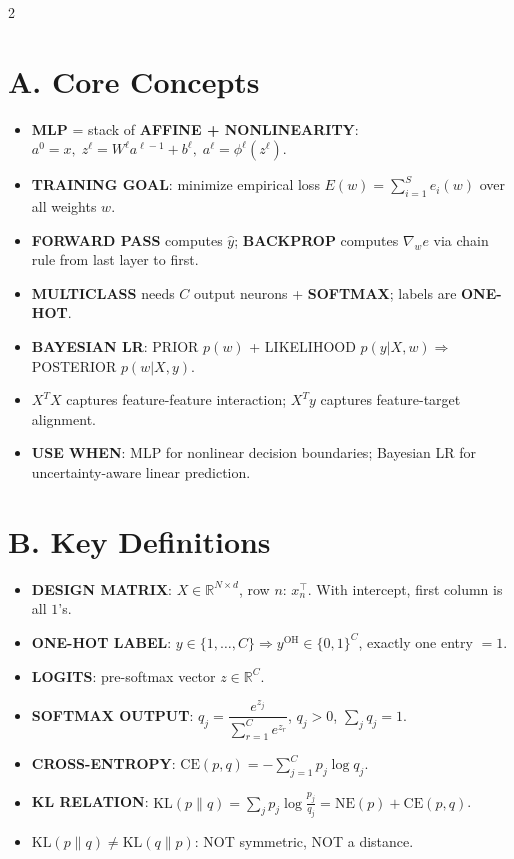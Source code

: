 \documentclass[10pt,fleqn]{article}
\begin{document}
\tiny
\begin{multicols}{2}

\section*{A. Core Concepts}
\begin{itemize}
  \item \textbf{MLP} = stack of \textbf{AFFINE + NONLINEARITY}: \(a^0=x,\; z^\ell=W^\ell a^{\ell-1}+b^\ell,\; a^\ell=\phi^\ell(z^\ell)\).
  \item \textbf{TRAINING GOAL}: minimize empirical loss \(E(w)=\sum_{i=1}^{S} e_i(w)\) over all weights \(w\).
  \item \textbf{FORWARD PASS} computes \(\hat y\); \textbf{BACKPROP} computes \(\nabla_w e\) via chain rule from last layer to first.
  \item \textbf{MULTICLASS} needs \(C\) output neurons + \textbf{SOFTMAX}; labels are \textbf{ONE-HOT}.
  \item \textbf{BAYESIAN LR}: PRIOR \(p(w)\) + LIKELIHOOD \(p(y|X,w)\Rightarrow\) POSTERIOR \(p(w|X,y)\).
  \item \(X^TX\) captures feature-feature interaction; \(X^Ty\) captures feature-target alignment.
  \item \textbf{USE WHEN}: MLP for nonlinear decision boundaries; Bayesian LR for uncertainty-aware linear prediction.
\end{itemize}

\section*{B. Key Definitions}
\begin{itemize}
  \item \textbf{DESIGN MATRIX}: \(X\in\mathbb{R}^{N\times d}\), row \(n\): \(x_n^\top\). With intercept, first column is all \(1\)'s.
  \item \textbf{ONE-HOT LABEL}: \(y\in\{1,\dots,C\}\Rightarrow y^{\text{OH}}\in\{0,1\}^C\), exactly one entry \(=1\).
  \item \textbf{LOGITS}: pre-softmax vector \(z\in\mathbb{R}^C\).
  \item \textbf{SOFTMAX OUTPUT}: \(q_j=\dfrac{e^{z_j}}{\sum_{r=1}^C e^{z_r}}\), \(q_j>0\), \(\sum_j q_j=1\).
  \item \textbf{CROSS-ENTROPY}: \(\mathrm{CE}(p,q)=-\sum_{j=1}^C p_j\log q_j\).
  \item \textbf{KL RELATION}: \(\mathrm{KL}(p\|q)=\sum_j p_j\log\frac{p_j}{q_j}= \mathrm{NE}(p)+\mathrm{CE}(p,q)\).
  \item \(\mathrm{KL}(p\|q)\neq \mathrm{KL}(q\|p)\): NOT symmetric, NOT a distance.
\end{itemize}


\end{multicols}
\end{document}
